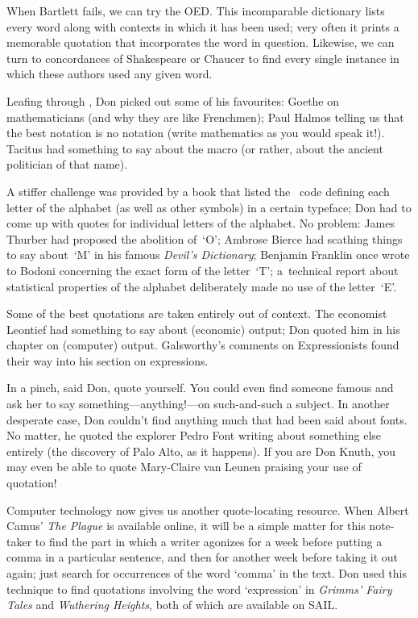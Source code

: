 When Bartlett fails, we can try the OED. This incomparable dictionary
lists every word along with contexts in which it has been used; very
often it prints a memorable quotation that incorporates the word in
question. Likewise, we can turn to concordances of Shakespeare or
Chaucer to find every single instance in which these authors used any
given word.

Leafing through \TeXbook, Don picked out some of his favourites:
Goethe on mathematicians (and why they are like Frenchmen); Paul
Halmos telling us that the best notation is no notation (write mathematics
as you would speak it!). Tacitus had something to say about the macro
(or rather, about the ancient politician of that name).

A stiffer challenge was provided by a book that listed the \MF\
 code defining each letter of the alphabet (as well as other
symbols) in a certain typeface; Don had to come up with quotes for
 individual letters of the alphabet.
  No problem: James Thurber had proposed the
abolition of~`O'; Ambrose Bierce had scathing things to say about~`M'
in his famous {\sl Devil's Dictionary}; Benjamin Franklin once wrote
to Bodoni concerning the exact form of the letter~`T';
a~technical report about statistical properties of the alphabet
deliberately made no use of the letter~`E'.

Some of the best quotations are taken entirely out of context. The
economist Leontief had something to say about (economic) output; Don
quoted him in his chapter on (computer) output. Galsworthy's comments
on Expressionists found their way into his section on expressions.

In a pinch, said Don, quote yourself. You could even find someone
famous and ask her to say something---anything!---on such-and-such a
subject.  In another desperate case, Don couldn't find anything much
that had been said about fonts. No matter, he quoted the explorer
Pedro Font writing about something else entirely (the discovery of
Palo Alto, as it happens).  If you are Don Knuth, you may even be able
to quote Mary-Claire van Leunen praising your use of quotation!

Computer technology now gives us another quote-locating resource. When
Albert Camus' {\sl The Plague\/} is available online, it will be a
simple matter for this note-taker to find the part in which a writer
agonizes for a week before putting a comma in a particular sentence,
and then for another week before taking it out again; just search for
occurrences of the word `comma' in the text. Don used this technique
to find quotations involving the word `expression' in {\sl Grimms'
Fairy Tales\/} and {\sl Wuthering Heights}, both of which are available
on SAIL.

